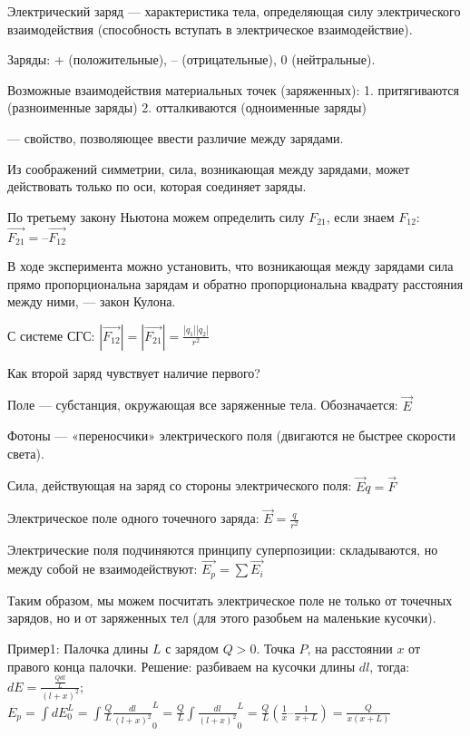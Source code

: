 ﻿\newcommand{\img}[1]{\texttt{[image: \#1.jpg]}}

Электрический заряд — характеристика тела, определяющая силу электрического взаимодействия (способность вступать в электрическое взаимодействие).

Заряды: + (положительные), – (отрицательные), 0 (нейтральные).

Возможные взаимодействия материальных точек (заряженных):
1.	притягиваются (разноименные заряды)
2.	отталкиваются (одноименные заряды)

 — свойство, позволяющее ввести различие между зарядами.

Из соображений симметрии, сила, возникающая между зарядами, может действовать только по оси, которая соединяет заряды.

По третьему закону Ньютона можем определить силу $F_21$, если знаем $F_12$: $\overrightarrow{F_21} = – \overrightarrow{F_12}$

В ходе эксперимента можно установить, что возникающая между зарядами сила прямо пропорциональна зарядам и обратно пропорциональна квадрату расстояния между ними, — закон Кулона.

С системе СГС: $|\overrightarrow{F_12} | = |\overrightarrow{F_21}| = \frac{|q_1||q_2|}{r^2}$

Как второй заряд чувствует наличие первого?

Поле — субстанция, окружающая все заряженные тела. Обозначается: $\overrightarrow{E}$

Фотоны — «переносчики» электрического поля (двигаются не быстрее скорости света).

Сила, действующая на заряд со стороны электрического поля: $\overrightarrow{E}q = \overrightarrow{F}$

Электрическое поле одного точечного заряда: $\overrightarrow{E} = \frac{q}{r^2}$

Электрические поля подчиняются принципу суперпозиции: складываются, но между собой не взаимодействуют: $\overrightarrow{E_p} = \sum{\overrightarrow{E_i}}$

Таким образом, мы можем посчитать электрическое поле не только от точечных зарядов, но и от заряженных тел (для этого разобьем на маленькие кусочки).

Пример1: Палочка длины $L$ с зарядом $Q > 0$. Точка $P$, на расстоянии $x$ от правого конца палочки.
Решение: разбиваем на кусочки длины $dl$, тогда: $dE = \frac{\frac{Qdl}{L}}{(l + x)^2}$; $E_p = \int{dE}_0^L = \int{\frac{Q}{L}\frac{dl}{(l + x)^2}}_0^L = \frac{Q}{L}\int{\frac{dl}{(l + x)^2}}_0^L  = \frac{Q}{L}(\frac{1}{x} – \frac{1}{x + L}) = \frac{Q}{x(x + L)}$

